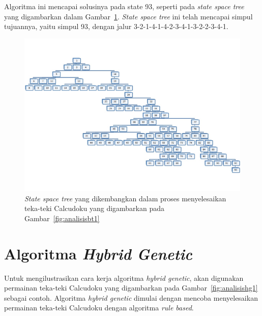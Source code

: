 Algoritma ini mencapai solusinya pada state 93, seperti pada \textit{state space tree} yang digambarkan dalam Gambar~\ref{fig:analisisbt33}. \textit{State space tree} ini telah mencapai simpul tujuannya, yaitu simpul 93, dengan jalur 3-2-1-4-1-4-2-3-4-1-3-2-2-3-4-1.

\begin{landscape}
\begin{figure}
\centering
\captionsetup{justification=centering}
\includegraphics[scale=0.75]{Gambar/backtracking/StateSpaceTree}
\caption[\textit{State space tree} yang dikembangkan dalam proses menyelesaikan teka-teki Calcudoku yang digambarkan pada Gambar~\ref{fig:analisisbt1}]{\textit{State space tree} yang dikembangkan dalam proses menyelesaikan teka-teki Calcudoku yang digambarkan pada Gambar~\ref{fig:analisisbt1}}
\label{fig:analisisbt33}
\end{figure}
\end{landscape}

\section{Algoritma \textit{Hybrid Genetic}}
\label{sec:analisishg}

Untuk mengilustrasikan cara kerja algoritma \textit{hybrid genetic}, akan digunakan permainan teka-teki Calcudoku yang digambarkan pada Gambar~\ref{fig:analisishg1} sebagai contoh. Algoritma \textit{hybrid genetic} dimulai dengan mencoba menyelesaikan permainan teka-teki Calcudoku dengan algoritma \textit{rule based}.

